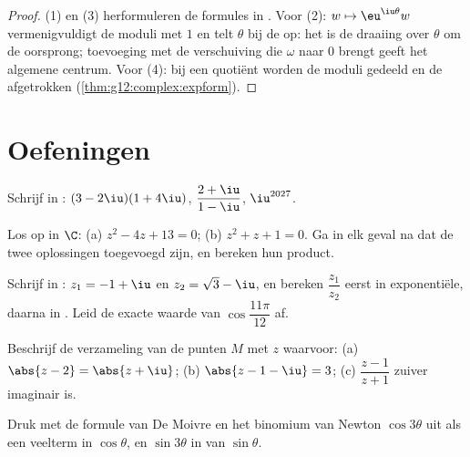 \begin{proof}
(1) en (3) herformuleren de formules in . Voor (2):
$w \mapsto \eu^{\iu\theta} w$ vermenigvuldigt de moduli met $1$ en telt
$\theta$ bij de  op: het is de draaiing over $\theta$ om de
oorsprong; toevoeging met de verschuiving die $\omega$ naar $0$ brengt geeft
het algemene centrum. Voor (4): bij een quotiënt worden de moduli gedeeld en
de  afgetrokken (\cref{thm:g12:complex:expform}).
\end{proof}

\section{Oefeningen}

\begin{exercise}[$\star$]\label{exo:g12:complex:1}
Schrijf in :
$(3 - 2\iu)(1 + 4\iu)$, \quad $\dfrac{2 + \iu}{1 - \iu}$, \quad
$\iu^{2027}$.
\end{exercise}

\begin{exercise}[$\star$]\label{exo:g12:complex:2}
Los op in $\C$: (a) $z^2 - 4z + 13 = 0$; (b) $z^2 + z + 1 = 0$. Ga in elk
geval na dat de twee oplossingen toegevoegd zijn, en bereken hun product.
\end{exercise}

\begin{exercise}[$\star$]\label{exo:g12:complex:3}
Schrijf in : $z_1 = -1 + \iu$ en $z_2 = \sqrt3 - \iu$, en
bereken $\dfrac{z_1}{z_2}$ eerst in exponentiële, daarna in . Leid de exacte waarde van $\cos\dfrac{11\pi}{12}$ af.
\end{exercise}

\begin{exercise}[$\star\star$]\label{exo:g12:complex:4}
Beschrijf  de verzameling van de punten $M$ met  $z$
waarvoor:
(a) $\abs{z - 2} = \abs{z + \iu}$;\quad
(b) $\abs{z - 1 - \iu} = 3$;\quad
(c) $\dfrac{z - 1}{z + 1}$ zuiver imaginair is.
\end{exercise}

\begin{exercise}[$\star\star$]\label{exo:g12:complex:5}
Druk met de formule van De Moivre en het binomium van Newton $\cos 3\theta$
uit als een veelterm in $\cos\theta$, en $\sin 3\theta$ in  van
$\sin\theta$.
\end{exercise}


